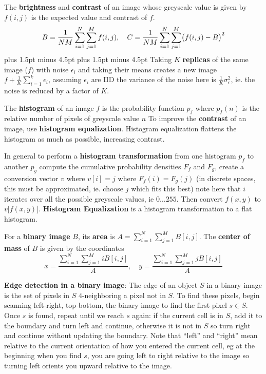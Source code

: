 \documentclass[10pt, twocolumn]{article}
\let\bold=\textbf
\begin{document}
\small

The \bold{brightness} and \bold{contrast} of an image whose greyscale value is given by $f(i,j)$ is the expected value and contrast of $f$.
$$
\belowdisplayskip=3pt plus 1.5pt minus 4.5pt
\abovedisplayskip=3pt plus 1.5pt minus 4.5pt
B = \frac1{NM}\sum_{i=1}^N\sum_{j=1}^M f(i,j), \quad C = \frac1{NM}\sum_{i=1}^N\sum_{j=1}^M \bigl(f(i,j)-B\bigr)^2 $$
\belowdisplayskip=3pt plus 1.5pt minus 4.5pt
\abovedisplayskip=3pt plus 1.5pt minus 4.5pt
Taking $K$ \bold{replicas} of the same image ($f$) with noise $\epsilon_i$ and taking their means creates a new image
$f + \frac1K\sum_{i=1}^k\epsilon_i$, assuming $\epsilon_i$ are IID the variance of the noise here is $\frac1K\sigma_\epsilon^2$, ie. the noise is reduced by a factor of $K$.

The \bold{histogram} of an image $f$ is the probability function $p_f$ where $p_f(n)$ is the relative number of pixels of greyscale value $n$
To improve the \bold{contrast} of an image, use \bold{histogram equalization}.
Histogram equalization flattens the histogram as much as possible, increasing contrast.

In general to perform a \bold{histogram transformation} from one histogram $p_f$ to another $p_g$ compute the cumulative probability densities $F_f$ and $F_g$, create a conversion
vector $v$ where $v[i]=j$ where $F_f(i)=F_g(j)$ (in discrete spaces, this must be approximated, ie. choose $j$ which fits this best) note here that $i$ iterates over all the possible
greyscale values, ie $0\dots255$.
Then convert $f(x,y)$ to $v\bigl[f(x,y)\bigr]$.
\bold{Histogram Equalization} is a histogram transformation to a flat histogram.

For a \bold{binary image} $B$, its \bold{area} is $A=\sum_{i=1}^N\sum_{j=1}^M B[i,j]$.
The \bold{center of mass} of $B$ is given by the coordinates
$$ x = \frac{\sum_{i=1}^N\sum_{j=1}^M iB[i,j]}A,\quad y = \frac{\sum_{i=1}^N\sum_{j=1}^M jB[i,j]}A $$

\bold{Edge detection in a binary image}: The edge of an object $S$ in a binary image is the set of pixels in $S$ $4$-neighboring a pixel not in $S$.
To find these pixels, begin scanning left-right, top-bottom, the binary image to find the first pixel $s\in S$.
Once $s$ is found, repeat until we reach $s$ again: if the current cell is in $S$, add it to the boundary and turn left and continue, otherwise it is not in $S$ so turn right and
continue without updating the boundary.
Note that ``left'' and ``right'' mean relative to the current orientation of how you entered the current cell, eg at the beginning when you find $s$, you are going left to right
relative to the image so turning left orients you upward relative to the image.
\end{document}
